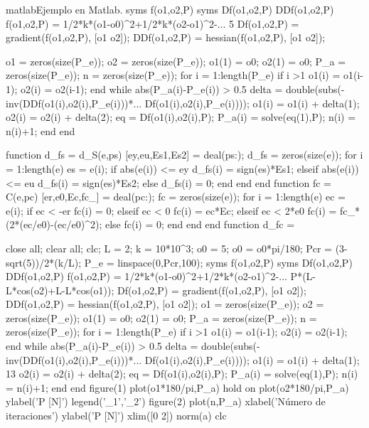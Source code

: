 \begin{sourcecode}{matlab}{Ejemplo en Matlab.}
syms f(o1,o2,P)
syms Df(o1,o2,P) DDf(o1,o2,P)
f(o1,o2,P) = 1/2*k*(o1-o0)^2+1/2*k*(o2-o1)^2-...
5
Df(o1,o2,P) = gradient(f(o1,o2,P), [o1 o2]);
DDf(o1,o2,P) = hessian(f(o1,o2,P), [o1 o2]);

o1 = zeros(size(P_e)); %
o2 = zeros(size(P_e)); %
o1(1) = o0;
o2(1) = o0;
P_a = zeros(size(P_e)); %
n = zeros(size(P_e)); %
for i = 1:length(P_e)
if i >1
o1(i) = o1(i-1);
o2(i) = o2(i-1);
end
while abs(P_a(i)-P_e(i)) > 0.5
delta = double(subs(-inv(DDf(o1(i),o2(i),P_e(i)))*...
Df(o1(i),o2(i),P_e(i))));
o1(i) = o1(i) + delta(1);
o2(i) = o2(i) + delta(2);
eq = Df(o1(i),o2(i),P);
P_a(i) = solve(eq(1),P);
n(i) = n(i)+1;
end
end

function d_fs = d_S(e,ps)
[ey,eu,Es1,Es2] = deal(ps{:});
d_fs = zeros(size(e));
for i = 1:length(e)
es = e(i);
if abs(e(i)) <= ey
d_fs(i) = sign(es)*Es1;
elseif abs(e(i)) <= eu
d_fs(i) = sign(es)*Es2;
else
d_fs(i) = 0;
end
end
end
function fc = C(e,pc)
[er,e0,Ec,fc_] = deal(pc{:});
fc = zeros(size(e));
for i = 1:length(e)
ec = e(i);
if ec < -er
fc(i) = 0;
elseif ec < 0
fc(i) = ec*Ec;
elseif ec < 2*e0
fc(i) = fc_*(2*(ec/e0)-(ec/e0)^2);
else
fc(i) = 0;
end
end
end
function d_fc =

close all; clear all; clc;
L = 2; %
k = 10*10^3; %
o0 = 5; %
o0 = o0*pi/180; %
Pcr = (3-sqrt(5))/2*(k/L); %
P_e = linspace(0,Pcr,100); %
syms f(o1,o2,P)
syms Df(o1,o2,P) DDf(o1,o2,P)
f(o1,o2,P) = 1/2*k*(o1-o0)^2+1/2*k*(o2-o1)^2-...
P*(L-L*cos(o2)+L-L*cos(o1));
Df(o1,o2,P) = gradient(f(o1,o2,P), [o1 o2]);
DDf(o1,o2,P) = hessian(f(o1,o2,P), [o1 o2]);
o1 = zeros(size(P_e)); %
o2 = zeros(size(P_e)); %
o1(1) = o0;
o2(1) = o0;
P_a = zeros(size(P_e)); %
n = zeros(size(P_e)); %
for i = 1:length(P_e)
if i >1
o1(i) = o1(i-1);
o2(i) = o2(i-1);
end
while abs(P_a(i)-P_e(i)) > 0.5
delta = double(subs(-inv(DDf(o1(i),o2(i),P_e(i)))*...
Df(o1(i),o2(i),P_e(i))));
o1(i) = o1(i) + delta(1);
13
o2(i) = o2(i) + delta(2);
eq = Df(o1(i),o2(i),P);
P_a(i) = solve(eq(1),P);
n(i) = n(i)+1;
end
end
figure(1)
plot(o1*180/pi,P_a)
hold on
plot(o2*180/pi,P_a)
ylabel('P [N]')
legend('\theta_1','\theta_2')
figure(2)
plot(n,P_a)
xlabel('Número de iteraciones')
ylabel('P [N]')
xlim([0 2])
norm(a)
clc


\end{sourcecode}

